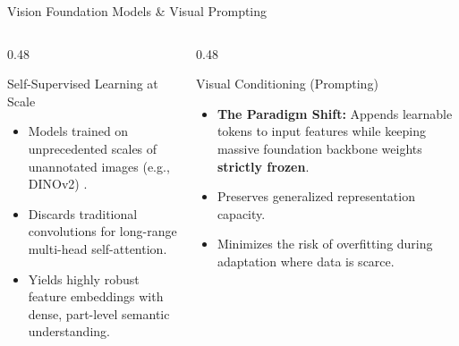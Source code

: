 \documentclass[aspectratio=169, 10pt]{beamer}
\begin{document}
\begin{frame}{Vision Foundation Models \& Visual Prompting}
    \begin{columns}[T]
        \begin{column}{0.48\textwidth}
            \begin{block}{Self-Supervised Learning at Scale}
                \begin{itemize}
                    \item Models trained on unprecedented scales of unannotated images (e.g., DINOv2) \cite{oquab2023dinov2}.
                    \item Discards traditional convolutions for long-range multi-head self-attention.
                    \item Yields highly robust feature embeddings with dense, part-level semantic understanding.
                \end{itemize}
            \end{block}
        \end{column}
        
        \begin{column}{0.48\textwidth}
            \begin{exampleblock}{Visual Conditioning (Prompting)}
                \begin{itemize}
                    \item \textbf{The Paradigm Shift:} Appends learnable tokens to input features while keeping massive foundation backbone weights \textbf{strictly frozen}.
                    \item Preserves generalized representation capacity.
                    \item Minimizes the risk of overfitting during adaptation where data is scarce.
                \end{itemize}
            \end{exampleblock}
        \end{column}
    \end{columns}
\end{frame}
\end{document}
